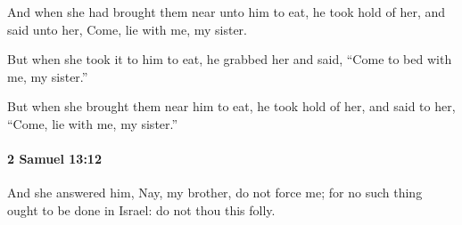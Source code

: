 			\begin{versebox}
					\item[BHS] 
					\item[ASV] And when she had brought them near unto him to eat, he took hold of her, and said unto her, Come, lie with me, my sister.
					\item[NIV] But when she took it to him to eat, he grabbed her and said, “Come to bed with me, my sister.”
					\item[NRSV] But when she brought them near him to eat, he took hold of her, and said to her, “Come, lie with me, my sister.”
			\end{versebox}

		\paragraph{2 Samuel 13:12} %
			\label{2SAMUEL-13-12}

			And she answered him, Nay, my brother, do not force me; for no such thing ought to be done in Israel: do not thou this folly.

